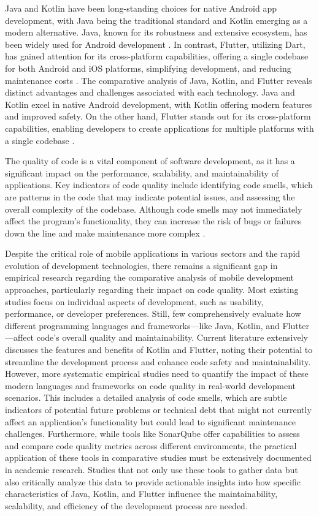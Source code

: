 Java and Kotlin have been long-standing choices for native Android app development, with Java being the traditional standard and Kotlin emerging as a modern alternative. Java, known for its robustness and extensive ecosystem, has been widely used for Android development \cite{wasilewski2021comparison}. In contrast, Flutter, utilizing Dart, has gained attention for its cross-platform capabilities, offering a single codebase for both Android and iOS platforms, simplifying development, and reducing maintenance costs \cite{prasetia2023development}. The comparative analysis of Java, Kotlin, and Flutter reveals distinct advantages and challenges associated with each technology. Java and Kotlin excel in native Android development, with Kotlin offering modern features and improved safety. On the other hand, Flutter stands out for its cross-platform capabilities, enabling developers to create applications for multiple platforms with a single codebase \cite{Meiller_2022}.
\par
The quality of code is a vital component of software development, as it has a significant impact on the performance, scalability, and maintainability of applications. Key indicators of code quality include identifying code smells, which are patterns in the code that may indicate potential issues, and assessing the overall complexity of the codebase. Although code smells may not immediately affect the program's functionality, they can increase the risk of bugs or failures down the line and make maintenance more complex \cite{banker1998software}.
\par
Despite the critical role of mobile applications in various sectors and the rapid evolution of development technologies, there remains a significant gap in empirical research regarding the comparative analysis of mobile development approaches, particularly regarding their impact on code quality. Most existing studies focus on individual aspects of development, such as usability, performance, or developer preferences. Still, few comprehensively evaluate how different programming languages and frameworks—like Java, Kotlin, and Flutter—affect code's overall quality and maintainability. Current literature extensively discusses the features and benefits of Kotlin and Flutter, noting their potential to streamline the development process and enhance code safety and maintainability. However, more systematic empirical studies need to quantify the impact of these modern languages and frameworks on code quality in real-world development scenarios. This includes a detailed analysis of code smells, which are subtle indicators of potential future problems or technical debt that might not currently affect an application's functionality but could lead to significant maintenance challenges. Furthermore, while tools like SonarQube offer capabilities to assess and compare code quality metrics across different environments, the practical application of these tools in comparative studies must be extensively documented in academic research. Studies that not only use these tools to gather data but also critically analyze this data to provide actionable insights into how specific characteristics of Java, Kotlin, and Flutter influence the maintainability, scalability, and efficiency of the development process are needed.

